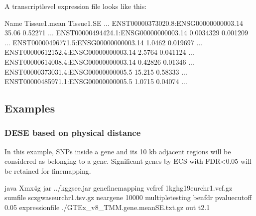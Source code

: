\documentclass[letterpaper,10pt,english,openany,oneside]{sphinxmanual}
\begin{document}
\sphinxAtStartPar
A transcript\sphinxhyphen{}level expression file looks like this:

\begin{sphinxVerbatim}[commandchars=\\\{\}]
Name                                   Tissue1.mean   Tissue1.SE     ...
ENST00000373020.8:ENSG00000000003.14   35.06          0.52271        ...
ENST00000494424.1:ENSG00000000003.14   0.0034329      0.001209       ...
ENST00000496771.5:ENSG00000000003.14   1.0462         0.019697       ...
ENST00000612152.4:ENSG00000000003.14   2.5764         0.041124       ...
ENST00000614008.4:ENSG00000000003.14   0.42826        0.01346        ...
ENST00000373031.4:ENSG00000000005.5    15.215         0.58333        ...
ENST00000485971.1:ENSG00000000005.5    1.0715         0.04074        ...
\end{sphinxVerbatim}


\newpage
\subsection{Examples}
\label{\detokenize{detailed_document:id3}}

\subsubsection{DESE based on physical distance}
\label{\detokenize{detailed_document:dese-based-on-physical-distance}}
\sphinxAtStartPar
In this example, SNPs inside a gene and its 10 kb adjacent regions will be considered as belonging to a gene. Significant genes by ECS with FDR\textless{}0.05 will be retained for fine\sphinxhyphen{}mapping.

\begin{sphinxVerbatim}[commandchars=\\\{\}]
java \PYGZhy{}Xmx4g \PYGZhy{}jar ../kggsee.jar 
  \PYGZhy{}\PYGZhy{}gene\PYGZhy{}finemapping 
  \PYGZhy{}\PYGZhy{}vcf\PYGZhy{}ref 1kg\PYGZus{}hg19\PYGZus{}eur\PYGZus{}chr1.vcf.gz 
  \PYGZhy{}\PYGZhy{}sum\PYGZhy{}file scz\PYGZus{}gwas\PYGZus{}eur\PYGZus{}chr1.tsv.gz 
  \PYGZhy{}\PYGZhy{}neargene 10000 
  \PYGZhy{}\PYGZhy{}multiple\PYGZhy{}testing benfdr 
  \PYGZhy{}\PYGZhy{}p\PYGZhy{}value\PYGZhy{}cutoff 0.05 
  \PYGZhy{}\PYGZhy{}expression\PYGZhy{}file ./GTEx_v8_TMM.gene.meanSE.txt.gz 
  \PYGZhy{}\PYGZhy{}out t2.1
\end{sphinxVerbatim}
\end{document}
